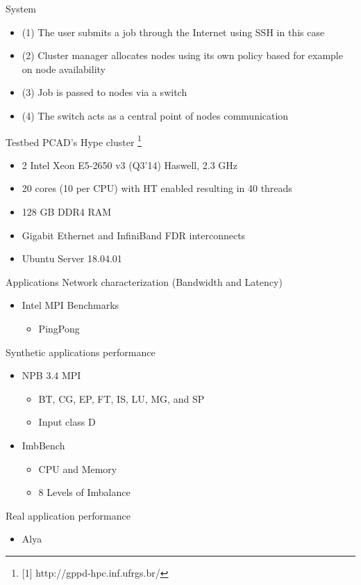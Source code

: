 \documentclass{beamer}
\begin{document}
\begin{frame}{System}
\begin{center}
\end{center}    
    \begin{itemize}
    \item (1) The user submits a job through the Internet using SSH in this case
    \item (2) Cluster manager allocates nodes using its own policy based for example on node availability
    \item (3) Job is passed to nodes via a switch
    \item (4) The switch acts as a central point of nodes communication
    \end{itemize}
\end{frame}

\begin{frame}{Testbed}
PCAD's Hype cluster \footnote{[1] http://gppd-hpc.inf.ufrgs.br/}
\begin{itemize}
\item 2 \texttimes{} Intel Xeon E5-2650 v3 (Q3'14) Haswell, 2.3 GHz
\item 20 cores (10 per CPU) with HT enabled resulting in 40 threads
\item 128 GB DDR4 RAM
\item Gigabit Ethernet and InfiniBand FDR interconnects
\item Ubuntu Server 18.04.01
\end{itemize}
\end{frame}

\begin{frame}{Applications}
Network characterization (Bandwidth and Latency)
    \begin{itemize}
        \item Intel MPI Benchmarks 
        \begin{itemize}
            \item PingPong
        \end{itemize}
    \end{itemize}
    \pause \vfill
Synthetic applications performance
    \begin{itemize}
        \item NPB 3.4 MPI
        \begin{itemize}
            \item BT, CG, EP, FT, IS, LU, MG, and SP
            \item Input class D
        \pause \vfill
        \end{itemize}
        \item ImbBench 
        \begin{itemize}
            \item CPU and Memory
            \item 8 Levels of Imbalance
        \end{itemize}
        \end{itemize}
        \pause \vfill
Real application performance
    \begin{itemize}
        \item Alya
    \end{itemize}
\end{frame}
\end{document}
